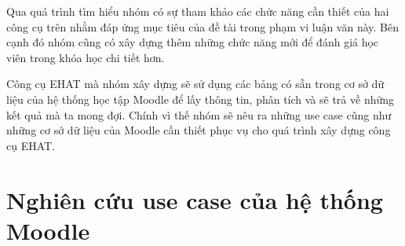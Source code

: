 \vskip 5cm

Qua quá trình tìm hiểu nhóm có sự tham khảo các chức năng cần thiết của hai công cụ trên nhằm đáp ứng mục tiêu của đề tài trong phạm vi luận văn này. Bên cạnh đó nhóm cũng có xây dựng thêm những chức năng mới để đánh giá học viên trong khóa học chi tiết hơn.

Công cụ EHAT mà nhóm xây dựng sẽ sử dụng các bảng có sẵn trong cơ sở dữ liệu của hệ thống học tập Moodle để lấy thông tin, phân tích và sẽ trả về những kết quả mà ta mong đợi. Chính vì thế nhóm sẽ nêu ra những use case cũng như những cơ sở dữ liệu của Moodle cần thiết phục vụ cho quá trình xây dựng công cụ EHAT.


\section{Nghiên cứu use case của hệ thống Moodle}
